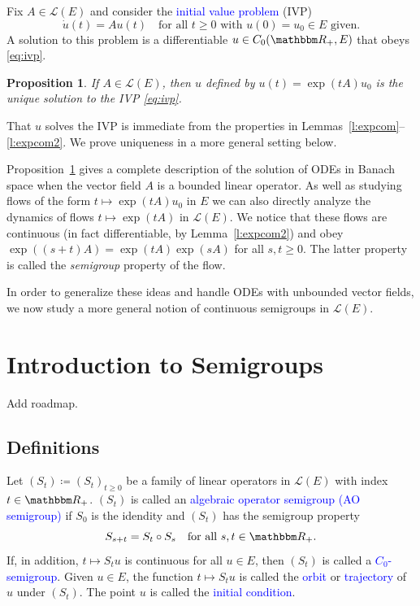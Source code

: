 \documentclass[12pt, reqno]{amsart}
\renewcommand{\geq}{\geqslant}
\newcommand{\1}{\mathbbm 1}
\newcommand{\lL}{\mathcal L}
\newcommand{\RR}{\mathbbm R}
\theoremstyle{plain}
\newtheorem{proposition}[theorem]{Proposition}
\theoremstyle{definition}
\newcommand{\navy}[1]{\textcolor{blue}{#1}}
\begin{document}
Fix $A \in \lL(E)$ and consider the \navy{initial value problem} (IVP) 
%
\begin{equation}\label{eq:ivp}
    \dot u(t) = A u(t)
    \quad \text{for all } t \geq 0 
    \text{ with } u(0) = u_0 \in E \text{ given}.     
\end{equation}
%
A solution to this problem is a differentiable $u \in C_0(\RR_+, E)$ that obeys
\eqref{eq:ivp}.

\begin{proposition}\label{p:expsol}
    If $A \in \lL(E)$, then $u$ defined by $u(t) = \exp(tA) u_0$ is
    the unique solution to the IVP \eqref{eq:ivp}.
\end{proposition}

That $u$ solves the IVP is immediate from the properties in
Lemmas~\ref{l:expcom}--\ref{l:expcom2}.  
We prove uniqueness in a more general setting below.

Proposition~\ref{p:expsol} gives a complete description of the solution of ODEs
in Banach space when the vector field $A$ is a bounded linear operator. As
well as studying flows of the form $t \mapsto \exp(tA) u_0$ in $E$ we can also
directly analyze the dynamics of flows $t \mapsto \exp(tA)$ in $\lL(E)$. We
notice that these flows are continuous (in fact differentiable, by
Lemma~\ref{l:expcom2}) and obey $\exp((s + t)A) = \exp(tA) \exp(sA)$ for all $s,
t \geq 0$.  The latter property is called the \emph{semigroup} property of the
flow.  

In order to generalize these ideas and handle ODEs with unbounded vector fields, 
we now study a more general notion of continuous semigroups in $\lL(E)$.


\section{Introduction to Semigroups}

Add roadmap.

\subsection{Definitions}

Let $(S_t) \coloneq (S_t)_{t \geq 0}$ be a family of
linear operators in $\lL(E)$ with index $t \in \RR_+$. $(S_t)$ is called 
an \navy{algebraic operator semigroup (AO semigroup)} if 
$S_0$ is the idendity and $(S_t)$ has the semigroup property
%
\begin{equation*}
    S_{s + t} = S_t \circ S_s
    \quad \text{for all } s, t \in \RR_+.
\end{equation*}
%
If, in addition, $t \mapsto S_t u$ is continuous for all $u \in E$, then $(S_t)$
is called a \navy{$C_0$-semigroup}.  Given $u \in E$, the function $t \mapsto S_t u$ is
called the \navy{orbit} or \navy{trajectory} of $u$ under $(S_t)$.
The point $u$ is called the \navy{initial condition}.
\end{document}
